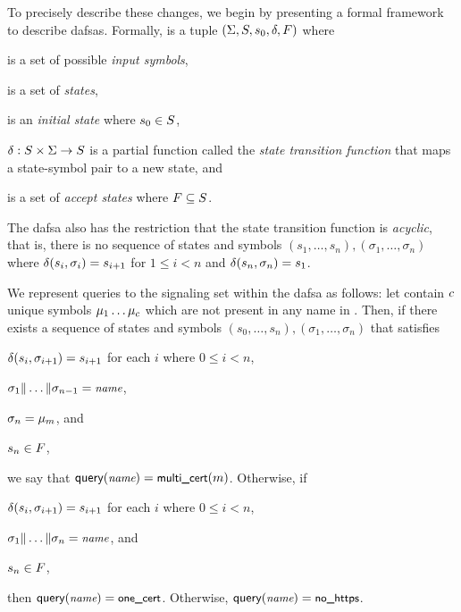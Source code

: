To precisely describe these changes, we begin by presenting a formal framework
to describe \acp{dafsa}. Formally,  is a tuple $(\Sigma, S,
s_0, \delta, F)$ where
\begin{inparaenum}
\item \symbols is a set of possible \emph{input symbols},
\item \states is a set of \emph{states},
\item \initstate is an \emph{initial state} where $s_0 \in S$,
\item $\delta: S \times \Sigma \to S$ is a partial function
  called the \emph{state transition function} that maps a state-symbol pair to a
  new state, and
\item \finalstates is a set of \emph{accept states} where $F
  \subseteq S$.
\end{inparaenum}
The \ac{dafsa} also has the restriction that the state transition function is
\emph{acyclic}, that is, there is no sequence of states and symbols $(s_1,
\ldots, s_n), (\sigma_1, \ldots, \sigma_n)$ where $\delta(s_i, \sigma_i) =
s_{i+1}$ for $1 \le i < n$ and $\delta(s_n, \sigma_n) = s_1$.

We represent queries to the signaling set within the \ac{dafsa} as follows: let
\symbols contain $c$ unique symbols $\mu_1\dots\mu_c$ 
which are not present in any name in \httpsset. 
Then, if there exists a sequence of
states and symbols $(s_0, \ldots, s_n), (\sigma_1, \ldots, \sigma_n)$ that
satisfies
\begin{inparaenum}
\item $\delta(s_i, \sigma_{i+1}) = s_{i+1}$ for each $i$ where $0 \le i < n$,
\item $\sigma_1 \| \dots \| \sigma_{n-1} = \small{\emph{name}}$, 
\item $\sigma_n = \mu_m$, and
\item $s_n \in F$,
\end{inparaenum}
we say that $\textsf{query}(\small{\emph{name}}) = \textsf{multi\_cert}(m)$.
Otherwise, if
\begin{inparaenum}
\item $\delta(s_i, \sigma_{i+1}) = s_{i+1}$ for each $i$ where $0 \le i < n$,
\item $\sigma_1 \| \dots \| \sigma_{n} = \small{\emph{name}}$, and
\item $s_n \in F$,
\end{inparaenum}
then $\textsf{query}(\small{\emph{name}}) = \textsf{one\_cert}$. Otherwise, $\textsf{query}(\small{\emph{name}}) = \textsf{no\_https}$.

